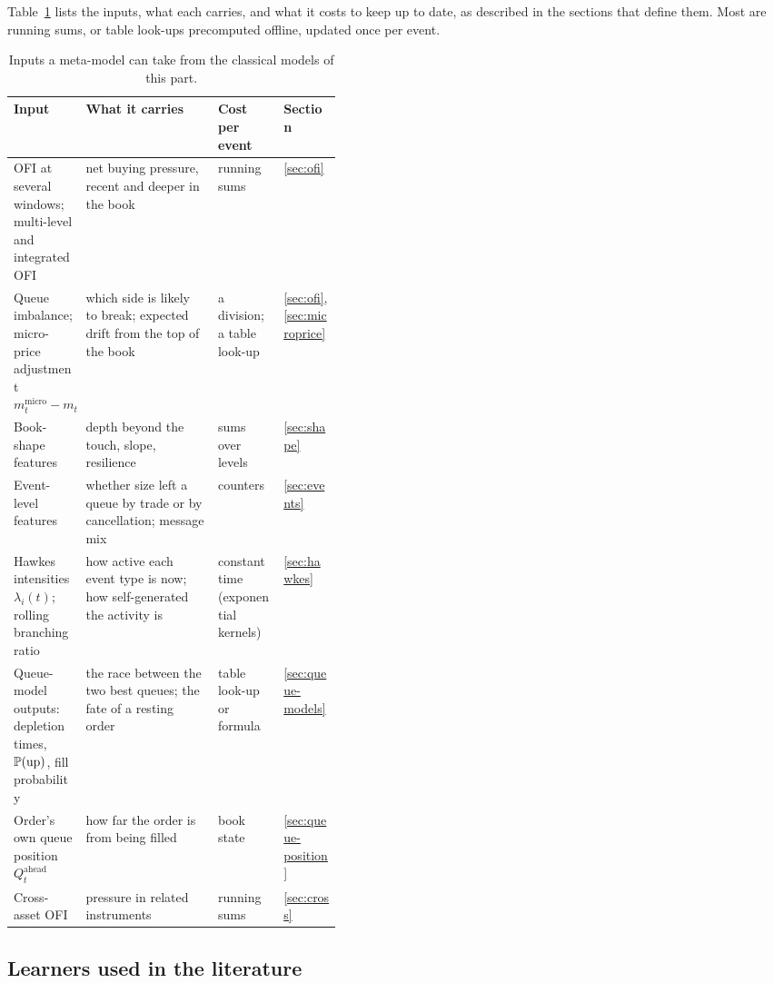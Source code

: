 Table~\ref{tab:meta-inputs} lists the inputs, what each carries, and what it costs to keep up to date,
as described in the sections that define them. Most are running sums, or table look-ups precomputed
offline, updated once per event.

\begin{table}[!htbp]
\centering\footnotesize
\caption{Inputs a meta-model can take from the classical models of this part.}
\label{tab:meta-inputs}
\setlength{\tabcolsep}{3pt}
\begin{tabularx}{\linewidth}{>{\raggedright\arraybackslash}p{0.22\linewidth}>{\raggedright\arraybackslash}X>{\raggedright\arraybackslash}p{0.2\linewidth}l}
\toprule
Input & What it carries & Cost per event & Section \\
\midrule
OFI at several windows; multi-level and integrated OFI & net buying pressure, recent and deeper in the book & running sums & \ref{sec:ofi} \\
Queue imbalance; micro-price adjustment $m^{\text{micro}}_t - m_t$ & which side is likely to break; expected drift from the top of the book & a division; a table look-up & \ref{sec:ofi}, \ref{sec:microprice} \\
Book-shape features & depth beyond the touch, slope, resilience & sums over levels & \ref{sec:shape} \\
Event-level features & whether size left a queue by trade or by cancellation; message mix & counters & \ref{sec:events} \\
Hawkes intensities $\lambda_i(t)$; rolling branching ratio & how active each event type is now; how self-generated the activity is & constant time (exponential kernels) & \ref{sec:hawkes} \\
Queue-model outputs: depletion times, $\P(\text{up})$, fill probability & the race between the two best queues; the fate of a resting order & table look-up or formula & \ref{sec:queue-models} \\
Order's own queue position $Q^{\text{ahead}}_t$ & how far the order is from being filled & book state & \ref{sec:queue-position} \\
Cross-asset OFI & pressure in related instruments & running sums & \ref{sec:cross} \\
\bottomrule
\end{tabularx}
\end{table}

\subsection{Learners used in the literature}
\label{sec:meta-learner}


